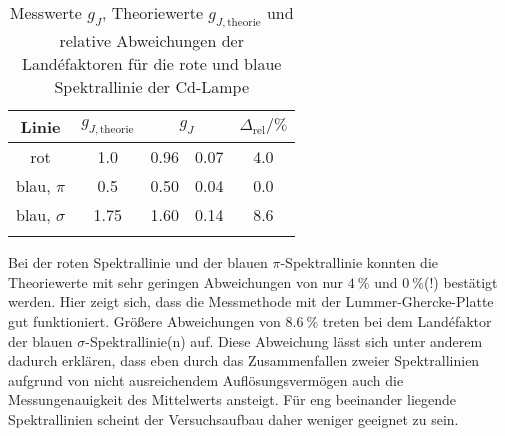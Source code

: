\begin{table}[H]
  \centering
  \caption{Messwerte $g_J$, Theoriewerte $g_{J,\text{theorie}}$ und relative Abweichungen der Landéfaktoren für
  die rote und blaue Spektrallinie der Cd-Lampe}
  \begin{tabular}{c S[table-format=1.2] S[table-format=1.2] @{${}\pm{}$} S[table-format=1.2] S[table-format=1.1]}
    \toprule
    {Linie} & {$g_{J,\text{theorie}}$} &  & {$\Delta_\text{rel}/\si{\percent}$}\\
    \midrule
    {rot}         & 1.0  & 0.96 & 0.07 & 4.0 \\
    \midrule
    {blau, $\pi$}    & 0.5  & 0.50 & 0.04 & 0.0 \\
    {blau, $\sigma$} & 1.75 & 1.60 & 0.14 & 8.6 \\
    \bottomrule
    \label{tab:landefaktoren}
  \end{tabular}
\end{table}

Bei der roten Spektrallinie und der blauen $\pi$-Spektrallinie konnten die Theoriewerte
mit sehr geringen Abweichungen von nur $\SI{4}{\percent}$ und $\SI{0}{\percent}$(!)
bestätigt werden. Hier zeigt sich, dass die Messmethode mit der Lummer-Ghercke-Platte
gut funktioniert. Größere Abweichungen von $\SI{8.6}{\percent}$ treten bei dem
Landéfaktor der blauen $\sigma$-Spektrallinie(n) auf. Diese Abweichung lässt sich unter anderem
dadurch erklären, dass eben durch das Zusammenfallen zweier Spektrallinien aufgrund von
nicht ausreichendem Auflösungsvermögen auch die Messungenauigkeit des Mittelwerts ansteigt.
Für eng beeinander liegende Spektrallinien scheint der Versuchsaufbau daher weniger geeignet zu sein.
